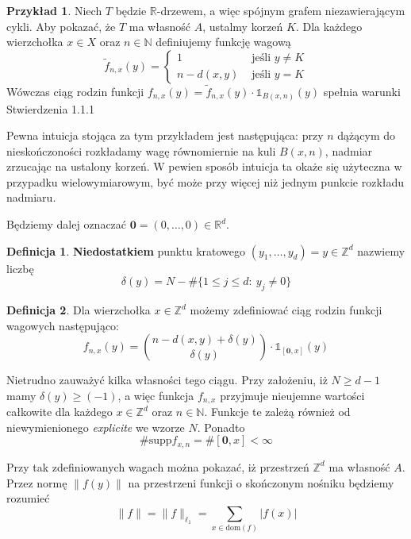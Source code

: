 \documentclass[licencjacka]{pracamgr}
\theoremstyle{definition}
\newtheorem{definition}{Definicja}[section]
\theoremstyle{definition}
\theoremstyle{definition}
\theoremstyle{definition}
\newtheorem{example}{Przykład}[section]
\theoremstyle{definition}
\theoremstyle{plain}
\theoremstyle{plain}
\begin{document}
\begin{example}
	Niech $ T $ będzie $ \mathbb{R} $-drzewem, a więc spójnym grafem niezawierającym cykli. 
	Aby pokazać, że $ T $ ma własność $ A $, ustalmy korzeń $ K $. Dla każdego wierzchołka 
	$ x \in X $ oraz $ n \in\mathbb{N} $ definiujemy funkcję wagową
	$$ \tilde f_{n,x}(y) = 
	\begin{cases}
		1 & \text{ jeśli } y \neq K \\
		n - d(x,y) & \text{ jeśli } y = K
	\end{cases} $$
	Wówczas ciąg rodzin funkcji $ f_{n,x}(y) = \tilde f_{n,x}(y) \cdot \mathbb{1}_{B
	(x, n)} (y) $ spełnia warunki Stwierdzenia 1.1.1
\end{example}

Pewna intuicja stojąca za tym przykładem jest następująca: przy $ n $ dążącym do 
nieskończoności rozkładamy wagę równomiernie na kuli $ B(x,n) $, nadmiar zrzucając na 
ustalony korzeń. W pewien sposób intuicja ta okaże się użyteczna w przypadku 
wielowymiarowym, być może przy więcej niż jednym punkcie rozkładu nadmiaru. 

Będziemy dalej oznaczać $ \textbf{0} = (0, \dots, 0) \in \mathbb{R}^d $.

\begin{definition}
	\textbf{Niedostatkiem} punktu kratowego $ (y_1, \dots, y_d) = y \in \mathbb{Z}^d $ 
	nazwiemy liczbę 
	$$ \delta(y) = N - \# \{1 \leq j \leq d: ~ y_j \neq 0 \} $$
\end{definition}

\begin{definition}
	Dla wierzchołka $ x \in \mathbb{Z}^d $ możemy zdefiniować ciąg rodzin funkcji wagowych 
	następująco:
	$$ f_{n,x}(y) = {n - d(x,y) + \delta(y) \choose \delta(y)} \cdot 
	\mathbb{1}_{[\textbf{0},x]} (y)$$
\end{definition}

Nietrudno zauważyć kilka własności tego ciągu. Przy założeniu, iż $ N \geq d - 1 $ mamy 
$ \delta(y) \geq (-1) $, a więc funkcja $ f_{n,x} $ przyjmuje nieujemne wartości 
całkowite dla każdego $ x \in \mathbb{Z}^d $ oraz $ n \in \mathbb{N} $. Funkcje te 
zależą również od niewymienionego \textit{explicite} we wzorze $ N $. Ponadto 
$$ \# \text{supp}f_{x,n} = \# [\textbf{0}, x] < \infty $$

Przy tak zdefiniowanych wagach można pokazać, iż przestrzeń $ \mathbb{Z}^d $ ma własność 
$ A $. Przez normę $ \| f(y)\| $ na przestrzeni funkcji o skończonym 
nośniku będziemy rozumieć 
$$ \| f \| = \| f \|_{\ell_1} = \sum\limits_{x \in \text{dom}(f)} |f(x)| $$
\end{document}

